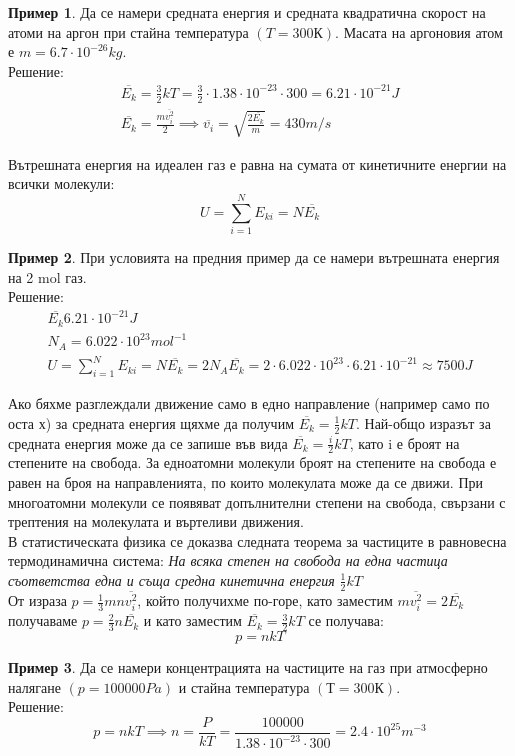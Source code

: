 \documentclass[fleqn, 12pt]{article}
\theoremstyle{definition}
\newtheorem{example}{Пример}[subsection]
\begin{document}
\begin{example}
Да се намери средната енергия и средната квадратична скорост на
атоми на аргон при стайна температура $(T = 300К)$. Масата на аргоновия атом е $m = 6.7 \cdot 10^{-26} kg$. \\
Решение: 
\begin{gather*}
\overline{E_k} = \frac{3}{2}kT = \frac{3}{2} \cdot  1.38 \cdot 10^{-23} \cdot 300 = 6.21 \cdot 10^{-21} J \\
\overline{E_k} = \frac{m\overline{v_i^2}}{2} \implies \overline{v_i} = \sqrt{\frac{2\overline{E_k}}{m}} = 430 m/s
\end{gather*}
\end{example}
Вътрешната енергия на идеален газ е равна на сумата от кинетичните енергии на
всички молекули: 
$$U = \sum _{i =1} ^N E_{ki} = N\overline{E_k}$$

\begin{example}
При условията на предния пример да се намери вътрешната енергия на
2 mol газ. \\
Решение:
\begin{gather*}
\overline{E_k} 6.21 \cdot 10^{-21} J \\
N_A = 6.022 \cdot 10^{23} mol^{-1} \\
U = \sum _{i =1} ^N E_{ki} = N\overline{E_k} = 2N_A \overline{E_k} = 2 \cdot 6.022 \cdot 10^{23} \cdot 6.21 \cdot 10^{-21} \approx 7500J
\end{gather*}
\end{example}
Ако бяхме разглеждали движение само в едно направление (например само по оста х) 
за средната енергия щяхме да получим $\overline{E_k} = \frac{1}{2}kT$. 
Най-общо изразът за средната енергия може да се запише във вида $\overline{E_k} = \frac{i}{2}kT$, 
като i е броят на степените на свобода. За едноатомни молекули броят на степените на свобода е равен на броя на
направленията, по които молекулата може да се движи. При многоатомни молекули се
появяват допълнителни степени на свобода, свързани с трептения на молекулата и
въртеливи движения. \\
В статистическата физика се доказва следната теорема за частиците в равновесна
термодинамична система: \textit{На всяка степен на свобода на една частица съответства
една и съща средна кинетична енергия} $\frac{1}{2}kT$ \\
От израза $p = \frac{1}{3} mn \overline{v_i ^2}$, който получихме по-горе, като заместим 
$m\overline{v_i ^2} = 2\overline{E_k}$ получаваме 
$p = \frac{2}{3}n \overline{E_k}$ и като заместим $\overline{E_k} = \frac{3}{2}kT$ се получава:
$$p = nkT$$
\begin{example}
Да се намери концентрацията на частиците на газ при атмосферно
налягане $(p =100000 Pa)$ и стайна температура $(Т = 300 К)$. \\
Решение: \\
$$p = nkT \implies n = \frac{P}{kT} = \frac{100000}{1.38 \cdot 10^{-23} \cdot 300} = 2.4 \cdot 10^{25} m^{-3}$$
\end{example}
\end{document}
